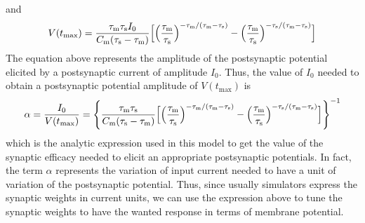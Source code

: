 \documentclass[a4paper, 12pt, twoside, openright]{book}
\begin{document}
and
\begin{equation}
    V(t_\text{max})=\dfrac{\tau_{\text{m}}\tau_{\text{s}}I_0}{C_{\text{m}}(\tau_{\text{s}}-\tau_{\text{m}})}\Bigl[ \Bigl(\dfrac{\tau_{\text{m}}}{\tau_{\text{s}}}\Bigr)^{-\tau_{\text{m}}/(\tau_{\text{m}}-\tau_{\text{s}})} - \Bigl(\dfrac{\tau_{\text{m}}}{\tau_{\text{s}}}\Bigr)^{-\tau_{\text{s}}/(\tau_{\text{m}}-\tau_{\text{s}})}  \Bigr]
    \label{eq:V(t_MAX)}
\end{equation}
The equation above represents the amplitude of the postsynaptic potential elicited by a postsynaptic current of amplitude $I_0$. Thus, the value of $I_0$ needed to obtain a postsynaptic potential amplitude of $V(t_\text{max})$ is
\begin{equation}
    \alpha = \dfrac{I_0}{V(t_\text{max})}=\Bigg\{ \dfrac{\tau_{\text{m}}\tau_{\text{s}}}{C_{\text{m}}(\tau_{\text{s}}-\tau_{\text{m}})}\Bigl[ \Bigl(\dfrac{\tau_{\text{m}}}{\tau_{\text{s}}}\Bigr)^{-\tau_{\text{m}}/(\tau_{\text{m}}-\tau_{\text{s}})} - \Bigl(\dfrac{\tau_{\text{m}}}{\tau_{\text{s}}}\Bigr)^{-\tau_{\text{s}}/(\tau_{\text{m}}-\tau_{\text{s}})}  \Bigr] \Bigg\}^{-1}
    \label{eq:PSC_over_PSP}
\end{equation}
which is the analytic expression used in this model to get the value of the synaptic efficacy needed to elicit an appropriate postsynaptic potentials. In fact, the term $\alpha$ represents the variation of input current needed to have a unit of variation of the postsynaptic potential. Thus, since usually simulators express the synaptic weights in current units, we can use the expression above to tune the synaptic weights to have the wanted response in terms of membrane potential.
\end{document}
